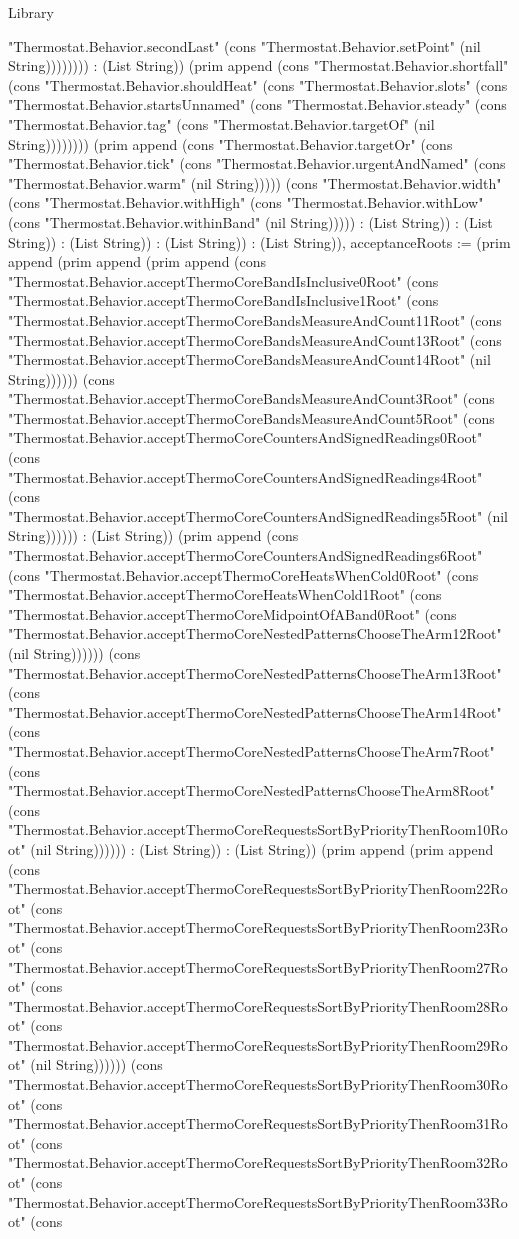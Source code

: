 \begin{lexlean}{Library}
\begin{semanticmodule}
{"Thermostat.Behavior.secondLast" (cons "Thermostat.Behavior.setPoint" (nil String)))))))) : (List String)) (prim append (cons "Thermostat.Behavior.shortfall" (cons "Thermostat.Behavior.shouldHeat" (cons "Thermostat.Behavior.slots" (cons "Thermostat.Behavior.startsUnnamed" (cons "Thermostat.Behavior.steady" (cons "Thermostat.Behavior.tag" (cons "Thermostat.Behavior.targetOf" (nil String)))))))) (prim append (cons "Thermostat.Behavior.targetOr" (cons "Thermostat.Behavior.tick" (cons "Thermostat.Behavior.urgentAndNamed" (cons "Thermostat.Behavior.warm" (nil String))))) (cons "Thermostat.Behavior.width" (cons "Thermostat.Behavior.withHigh" (cons "Thermostat.Behavior.withLow" (cons "Thermostat.Behavior.withinBand" (nil String))))) : (List String)) : (List String)) : (List String)) : (List String)) : (List String)), acceptanceRoots := (prim append (prim append (prim append (cons "Thermostat.Behavior.acceptThermoCoreBandIsInclusive0Root" (cons "Thermostat.Behavior.acceptThermoCoreBandIsInclusive1Root" (cons "Thermostat.Behavior.acceptThermoCoreBandsMeasureAndCount11Root" (cons "Thermostat.Behavior.acceptThermoCoreBandsMeasureAndCount13Root" (cons "Thermostat.Behavior.acceptThermoCoreBandsMeasureAndCount14Root" (nil String)))))) (cons "Thermostat.Behavior.acceptThermoCoreBandsMeasureAndCount3Root" (cons "Thermostat.Behavior.acceptThermoCoreBandsMeasureAndCount5Root" (cons "Thermostat.Behavior.acceptThermoCoreCountersAndSignedReadings0Root" (cons "Thermostat.Behavior.acceptThermoCoreCountersAndSignedReadings4Root" (cons "Thermostat.Behavior.acceptThermoCoreCountersAndSignedReadings5Root" (nil String)))))) : (List String)) (prim append (cons "Thermostat.Behavior.acceptThermoCoreCountersAndSignedReadings6Root" (cons "Thermostat.Behavior.acceptThermoCoreHeatsWhenCold0Root" (cons "Thermostat.Behavior.acceptThermoCoreHeatsWhenCold1Root" (cons "Thermostat.Behavior.acceptThermoCoreMidpointOfABand0Root" (cons "Thermostat.Behavior.acceptThermoCoreNestedPatternsChooseTheArm12Root" (nil String)))))) (cons "Thermostat.Behavior.acceptThermoCoreNestedPatternsChooseTheArm13Root" (cons "Thermostat.Behavior.acceptThermoCoreNestedPatternsChooseTheArm14Root" (cons "Thermostat.Behavior.acceptThermoCoreNestedPatternsChooseTheArm7Root" (cons "Thermostat.Behavior.acceptThermoCoreNestedPatternsChooseTheArm8Root" (cons "Thermostat.Behavior.acceptThermoCoreRequestsSortByPriorityThenRoom10Root" (nil String)))))) : (List String)) : (List String)) (prim append (prim append (cons "Thermostat.Behavior.acceptThermoCoreRequestsSortByPriorityThenRoom22Root" (cons "Thermostat.Behavior.acceptThermoCoreRequestsSortByPriorityThenRoom23Root" (cons "Thermostat.Behavior.acceptThermoCoreRequestsSortByPriorityThenRoom27Root" (cons "Thermostat.Behavior.acceptThermoCoreRequestsSortByPriorityThenRoom28Root" (cons "Thermostat.Behavior.acceptThermoCoreRequestsSortByPriorityThenRoom29Root" (nil String)))))) (cons "Thermostat.Behavior.acceptThermoCoreRequestsSortByPriorityThenRoom30Root" (cons "Thermostat.Behavior.acceptThermoCoreRequestsSortByPriorityThenRoom31Root" (cons "Thermostat.Behavior.acceptThermoCoreRequestsSortByPriorityThenRoom32Root" (cons "Thermostat.Behavior.acceptThermoCoreRequestsSortByPriorityThenRoom33Root" (cons }
\end{semanticmodule}
\end{lexlean}
